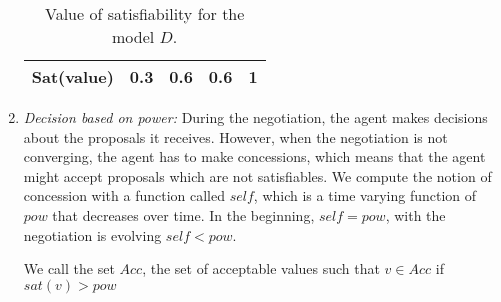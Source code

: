 \documentclass{llncs}
\begin{document}
\begin{enumerate}
\begin{table}
\begin{tabular}{ |c|c|c|c|c| }
			 		\hline
			 		Sat(value) & 0.3 & 0.6 & 0.6 & 1 \\
			 		\hline
			 		
			 	\end{tabular}
			 	\caption{Value of satisfiability for the model $D$.}
			 	\label{sat}
			 \end{table}
		
		\item \textit{Decision based on power: } During the negotiation, the agent makes decisions about the proposals it receives. However, when the negotiation is not converging, the agent  has to make concessions, which means that the agent might accept proposals which are not satisfiables. We compute the notion of concession with a function called $self$, which is a time varying function of $pow$ that decreases over time. In the beginning, $self = pow$, with the negotiation is evolving $self < pow$. 
		
		We call the set $Acc$, the set of acceptable values such that $ v \in Acc$ if $sat(v) > pow$ 
	\end{enumerate}
	
\end{document}

